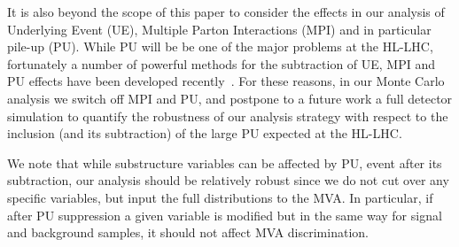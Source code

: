 It is also beyond the scope of this paper to
consider
the effects in our analysis of  Underlying Event (UE),
Multiple Parton Interactions (MPI) and in
particular
pile-up (PU).
%
While PU will be be one of the major problems at the HL-LHC, fortunately
a number of powerful methods for the subtraction of  UE, MPI and PU
effects 
have been developed recently~\cite{Cacciari:2009dp,TheATLAScollaboration:2013pia,Butterworth:2008iy,Cacciari:2007fd,Krohn:2009th,Krohn:2013lba,Ellis:2009me,Bertolini:2014bba,Cacciari:2014gra,Cacciari:2014jta,Berta:2014eza,Larkoski:2014wba}.
%
For these reasons, in our Monte Carlo analysis we switch off MPI and PU,
and postpone to a future work a full detector simulation
to quantify the robustness
of our analysis strategy with respect to the inclusion
(and its subtraction) of the large PU
expected at the HL-LHC.


We note that while substructure variables can be affected by PU, event after its
subtraction, our analysis should be relatively robust since we do not cut
over any specific variables, but input the full distributions to the MVA.
%
In particular, if after PU suppression a given variable is modified
but in the same way for signal and background samples, it should not
affect MVA discrimination.
